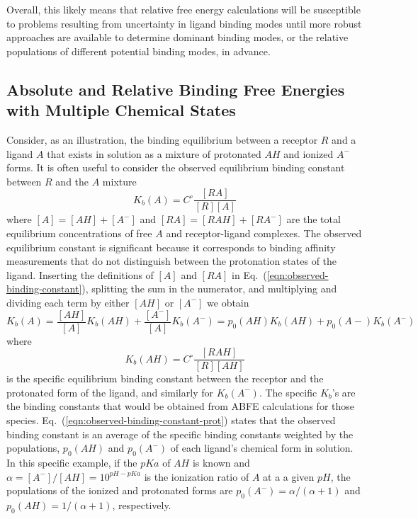 \documentclass[9pt,bestpractices]{livecoms}
\begin{document}
Overall, this likely means that relative free energy calculations will be susceptible to problems resulting from uncertainty in ligand binding modes until more robust approaches are available to determine dominant binding modes, or the relative populations of different potential binding modes, in advance.

\subsection{Absolute and Relative Binding Free Energies with Multiple Chemical States}

Consider, as an illustration, the binding equilibrium between a receptor $R$ and a ligand $A$ that exists in solution as a mixture of protonated $AH$ and ionized $A^-$ forms. It is often useful to consider the observed equilibrium binding constant between $R$ and the $A$ mixture 
\begin{equation}
  K_b(A) = C^\circ \frac{[RA]}{[R][A]}
  \label{eqn:observed-binding-constant}
\end{equation}
where $[A] = [AH] + [A^-]$ and $[RA] = [RAH] + [RA^-]$ are the total equilibrium concentrations of free $A$ and receptor-ligand complexes. The observed equilibrium constant is significant because it corresponds to binding affinity measurements that do not distinguish between the protonation states of the ligand. Inserting the definitions of $[A]$ and $[RA]$ in Eq.~(\ref{eqn:observed-binding-constant}), splitting the sum in the numerator, and multiplying and dividing each term by either $[AH]$ or $[A^-]$ we obtain
\begin{equation}
  K_b(A) = \frac{[AH]}{[A]}  K_b(AH) +  \frac{[A^-]}{[A]} K_b(A^-) =  p_0(AH) K_b(AH) +  p_0(A-) K_b(A^-)
  \label{eqn:observed-binding-constant-split}
\end{equation}
where
\begin{equation}
  K_b(AH) = C^\circ \frac{[RAH]}{[R][AH]}
  \label{eqn:observed-binding-constant-prot}
\end{equation}
is the specific equilibrium binding constant between the receptor and the protonated form of the ligand, and similarly for $K_b(A^-)$. The specific $K_b$'s are the binding constants that would be obtained from ABFE calculations for those species. Eq.~(\ref{eqn:observed-binding-constant-prot}) states that the observed binding constant is an average of the specific binding constants weighted by the populations, $p_0(AH)$ and  $p_0(A^-)$ of each ligand's chemical form in solution. In this specific example, if the $pKa$ of $AH$ is known and $\alpha = [A^-]/[AH] = 10^{pH-pKa} $ is the ionization ratio of $A$ at a a given $pH$, the populations of the ionized and protonated forms are $p_0(A^-) = \alpha/(\alpha+1)$ and $p_0(AH) = 1/(\alpha+1)$, respectively.\cite{champion2024multistate,azimi2022application}
\end{document}
